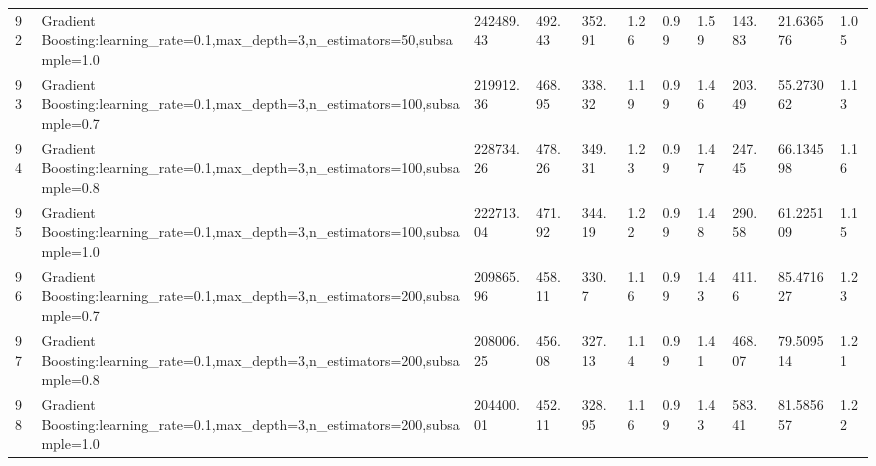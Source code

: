 \begin{longtable}{C{0.8cm} L{2cm} C{1.15cm} C{1.15cm} C{1.15cm} C{1.15cm} C{0.85cm} C{1.25cm} C{1.2cm} C{1.5cm} C{1.0cm}}
92 & Gradient Boosting:\newline learning\_rate=0.1,\newline max\_depth=3,\newline n\_estimators=50,\newline subsample=1.0 & 242489.43 & 492.43 & 352.91 & 1.26 & 0.99 & 1.59 & 143.83 & 21.636576 & 1.05 \\
93 & Gradient Boosting:\newline learning\_rate=0.1,\newline max\_depth=3,\newline n\_estimators=100,\newline subsample=0.7 & 219912.36 & 468.95 & 338.32 & 1.19 & 0.99 & 1.46 & 203.49 & 55.273062 & 1.13 \\
94 & Gradient Boosting:\newline learning\_rate=0.1,\newline max\_depth=3,\newline n\_estimators=100,\newline subsample=0.8 & 228734.26 & 478.26 & 349.31 & 1.23 & 0.99 & 1.47 & 247.45 & 66.134598 & 1.16 \\
95 & Gradient Boosting:\newline learning\_rate=0.1,\newline max\_depth=3,\newline n\_estimators=100,\newline subsample=1.0 & 222713.04 & 471.92 & 344.19 & 1.22 & 0.99 & 1.48 & 290.58 & 61.225109 & 1.15 \\
96 & Gradient Boosting:\newline learning\_rate=0.1,\newline max\_depth=3,\newline n\_estimators=200,\newline subsample=0.7 & 209865.96 & 458.11 & 330.7 & 1.16 & 0.99 & 1.43 & 411.6 & 85.471627 & 1.23 \\
97 & Gradient Boosting:\newline learning\_rate=0.1,\newline max\_depth=3,\newline n\_estimators=200,\newline subsample=0.8 & 208006.25 & 456.08 & 327.13 & 1.14 & 0.99 & 1.41 & 468.07 & 79.509514 & 1.21 \\
98 & Gradient Boosting:\newline learning\_rate=0.1,\newline max\_depth=3,\newline n\_estimators=200,\newline subsample=1.0 & 204400.01 & 452.11 & 328.95 & 1.16 & 0.99 & 1.43 & 583.41 & 81.585657 & 1.22 \\

\end{longtable}

